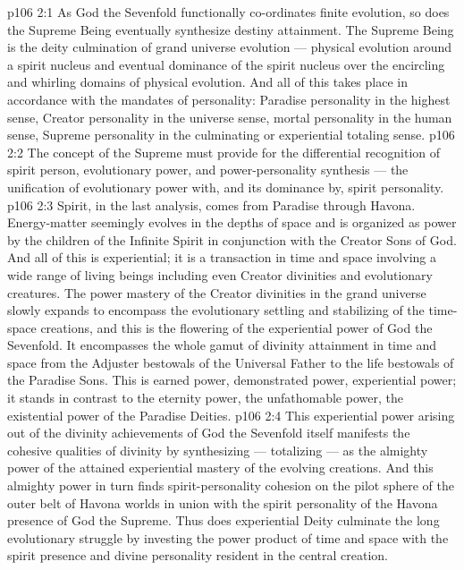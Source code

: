 \vs p106 2:1 As God the Sevenfold functionally co\hyp{}ordinates finite evolution, so does the Supreme Being eventually synthesize destiny attainment. The Supreme Being is the deity culmination of grand universe evolution --- physical evolution around a spirit nucleus and eventual dominance of the spirit nucleus over the encircling and whirling domains of physical evolution. And all of this takes place in accordance with the mandates of personality: Paradise personality in the highest sense, Creator personality in the universe sense, mortal personality in the human sense, Supreme personality in the culminating or experiential totaling sense.
\vs p106 2:2 \pc The concept of the Supreme must provide for the differential recognition of spirit person, evolutionary power, and power\hyp{}personality synthesis --- the unification of evolutionary power with, and its dominance by, spirit personality.
\vs p106 2:3 Spirit, in the last analysis, comes from Paradise through Havona. Energy\hyp{}matter seemingly evolves in the depths of space and is organized as power by the children of the Infinite Spirit in conjunction with the Creator Sons of God. And all of this is experiential; it is a transaction in time and space involving a wide range of living beings including even Creator divinities and evolutionary creatures. The power mastery of the Creator divinities in the grand universe slowly expands to encompass the evolutionary settling and stabilizing of the time\hyp{}space creations, and this is the flowering of the experiential power of God the Sevenfold. It encompasses the whole gamut of divinity attainment in time and space from the Adjuster bestowals of the Universal Father to the life bestowals of the Paradise Sons. This is earned power, demonstrated power, experiential power; it stands in contrast to the eternity power, the unfathomable power, the existential power of the Paradise Deities.
\vs p106 2:4 This experiential power arising out of the divinity achievements of God the Sevenfold itself manifests the cohesive qualities of divinity by synthesizing --- totalizing --- as the almighty power of the attained experiential mastery of the evolving creations. And this almighty power in turn finds spirit\hyp{}personality cohesion on the pilot sphere of the outer belt of Havona worlds in union with the spirit personality of the Havona presence of God the Supreme. Thus does experiential Deity culminate the long evolutionary struggle by investing the power product of time and space with the spirit presence and divine personality resident in the central creation.
